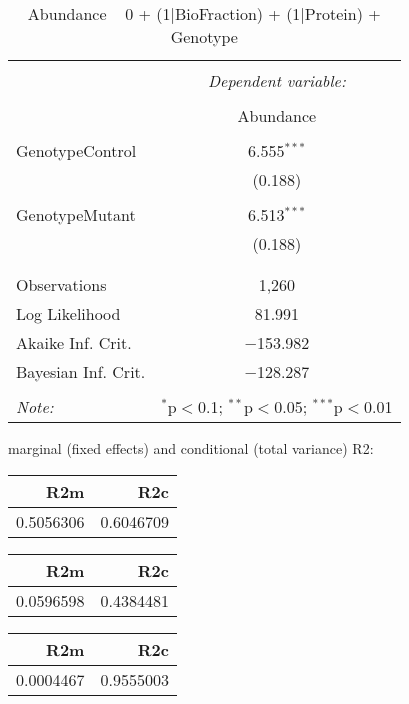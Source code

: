 \documentclass[11pt]{report}
\begin{document}
\begin{table}[!htbp] \centering 
  \caption{Abundance ~ 0 + (1|BioFraction) + (1|Protein) + Genotype} 
  \label{} 
\begin{tabular}{@{\extracolsep{5pt}}lc} 
\\[-1.8ex]\hline 
\hline \\[-1.8ex] 
 & \multicolumn{1}{c}{\textit{Dependent variable:}} \\ 
\cline{2-2} 
\\[-1.8ex] & Abundance \\ 
\hline \\[-1.8ex] 
 GenotypeControl & 6.555$^{***}$ \\ 
  & (0.188) \\ 
  & \\ 
 GenotypeMutant & 6.513$^{***}$ \\ 
  & (0.188) \\ 
  & \\ 
\hline \\[-1.8ex] 
Observations & 1,260 \\ 
Log Likelihood & 81.991 \\ 
Akaike Inf. Crit. & $-$153.982 \\ 
Bayesian Inf. Crit. & $-$128.287 \\ 
\hline 
\hline \\[-1.8ex] 
\textit{Note:}  & \multicolumn{1}{r}{$^{*}$p$<$0.1; $^{**}$p$<$0.05; $^{***}$p$<$0.01} \\ 
\end{tabular} 
\end{table} 
marginal (fixed effects) and conditional (total variance) R2:

\begin{tabular}{r|r}
\hline
R2m & R2c\\
\hline
0.5056306 & 0.6046709\\
\hline
\end{tabular}

\begin{tabular}{r|r}
\hline
R2m & R2c\\
\hline
0.0596598 & 0.4384481\\
\hline
\end{tabular}

\begin{tabular}{r|r}
\hline
R2m & R2c\\
\hline
0.0004467 & 0.9555003\\
\hline
\end{tabular}
\end{document}
